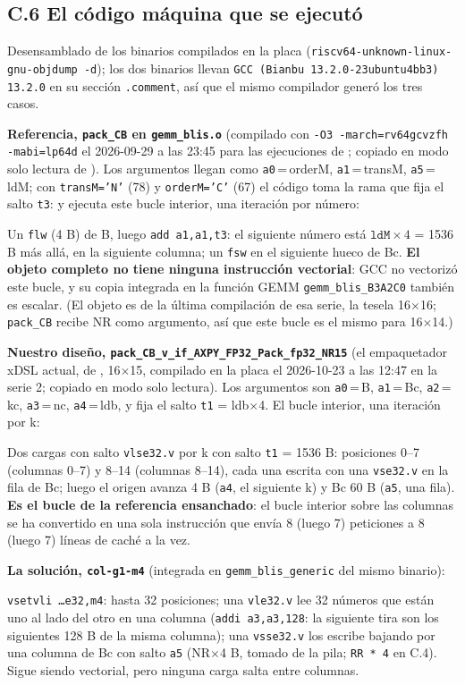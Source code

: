 \subsection*{C.6 El código máquina que se ejecutó}
Desensamblado de los binarios compilados en la placa (\texttt{riscv64-unknown-linux-gnu-objdump -d}); los dos binarios llevan
\texttt{GCC (Bianbu 13.2.0-23ubuntu4bb3) 13.2.0} en su sección \texttt{.comment}, así que el mismo compilador generó los tres casos.

\textbf{Referencia, \texttt{pack\_CB} en \texttt{gemm\_blis.o}} (compilado con \texttt{-O3 -march=rv64gcvzfh -mabi=lp64d} el
2026-09-29 a las 23:45 para las ejecuciones de ; copiado en modo solo lectura de ).
Los argumentos llegan como \texttt{a0}\,=\,orderM, \texttt{a1}\,=\,transM, \texttt{a5}\,=\,ldM; con \texttt{transM='N'} (78) y
\texttt{orderM='C'} (67) el código toma la rama que fija el salto \texttt{t3}:
y ejecuta este bucle interior, una iteración por número:

Un \texttt{flw} (4 B) de B, luego \texttt{add a1,a1,t3}: el siguiente número está $\texttt{ldM}\times4$ = 1536 B más allá, en la
siguiente columna; un \texttt{fsw} en el siguiente hueco de Bc. \textbf{El objeto completo no tiene ninguna instrucción vectorial}: GCC
no vectorizó este bucle, y su copia integrada en la función GEMM \texttt{gemm\_blis\_B3A2C0} también es escalar. (El objeto es de la
última compilación de esa serie, la tesela 16$\times$16; \texttt{pack\_CB} recibe NR como argumento, así que este bucle es el mismo para
16$\times$14.)

\textbf{Nuestro diseño, \texttt{pack\_CB\_v\_if\_AXPY\_FP32\_Pack\_fp32\_NR15}} (el empaquetador xDSL actual, de
, 16$\times$15, compilado en la placa el 2026-10-23 a las 12:47 en la serie 2; copiado en
modo solo lectura). Los argumentos son \texttt{a0}\,=\,B, \texttt{a1}\,=\,Bc, \texttt{a2}\,=\,kc, \texttt{a3}\,=\,nc,
\texttt{a4}\,=\,ldb, y
fija el salto \texttt{t1} = ldb$\times$4. El bucle interior, una iteración por k:

Dos cargas con salto \texttt{vlse32.v} por k con salto \texttt{t1} = 1536 B: posiciones 0--7 (columnas 0--7) y 8--14 (columnas
8--14), cada una escrita con una \texttt{vse32.v} en la fila de Bc; luego el origen avanza 4 B (\texttt{a4}, el siguiente k) y Bc 60 B
(\texttt{a5}, una fila). \textbf{Es el bucle de la referencia ensanchado}: el bucle interior sobre las columnas se ha convertido en una
sola instrucción que envía 8 (luego 7) peticiones a 8 (luego 7) líneas de caché a la vez.

\textbf{La solución, \texttt{col-g1-m4}} (integrada en \texttt{gemm\_blis\_generic} del mismo binario):

\texttt{vsetvli \dots e32,m4}: hasta 32 posiciones; una \texttt{vle32.v} lee 32 números que están uno al lado del otro en una columna
(\texttt{addi a3,a3,128}: la siguiente tira son los siguientes 128 B de la misma columna); una \texttt{vsse32.v} los escribe bajando por
una columna de Bc con salto \texttt{a5} (NR$\times$4 B, tomado de la pila; \texttt{RR * 4} en C.4). Sigue siendo vectorial, pero ninguna
carga salta entre columnas.



